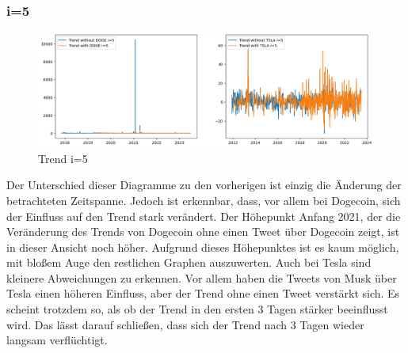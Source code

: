 \documentclass{article}
\begin{document}
\subsubsection{i=5} \label{i=5}
\begin{figure}[!htb]
  	\includegraphics[width=\textwidth, center]{../imgs/Trendi5.png}
 	\caption{Trend i=5}
 	\label{fig:Trendi5}
\end{figure}
Der Unterschied dieser Diagramme zu den vorherigen ist einzig die Änderung der betrachteten Zeitspanne. Jedoch ist erkennbar, dass, vor allem bei Dogecoin, sich der Einfluss auf den Trend stark verändert. Der Höhepunkt Anfang 2021, der die Veränderung des Trends von Dogecoin ohne einen Tweet über Dogecoin zeigt, ist in dieser Ansicht noch höher. Aufgrund dieses Höhepunktes ist es kaum möglich, mit bloßem Auge den restlichen Graphen auszuwerten. Auch bei Tesla sind kleinere Abweichungen zu erkennen. Vor allem haben die Tweets von Musk über Tesla einen höheren Einfluss, aber der Trend ohne einen Tweet verstärkt sich. Es scheint trotzdem so, als ob der Trend in den ersten 3 Tagen stärker beeinflusst wird. Das lässt darauf schließen, dass sich der Trend nach 3 Tagen wieder langsam verflüchtigt.
\end{document}
